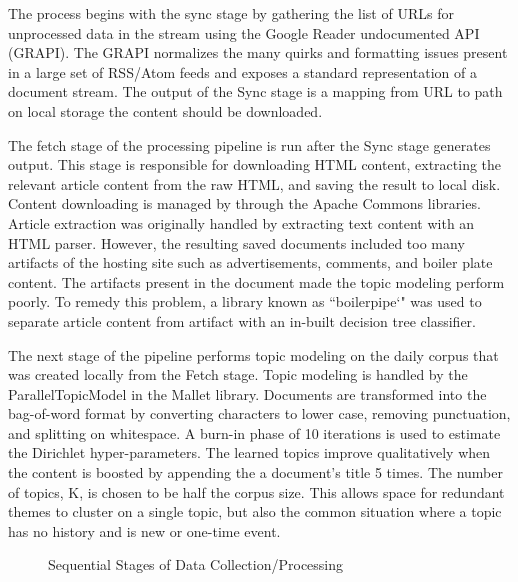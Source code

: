 \documentclass[10pt]{article}
\begin{document}
The process begins with the sync stage by gathering the list of URLs for unprocessed data in the stream using the Google Reader undocumented API (GRAPI).  The GRAPI normalizes the many quirks and formatting issues present in a large set of RSS/Atom feeds and exposes a standard representation of a document stream.  The output of the Sync stage is a mapping from URL to path on local storage the content should be downloaded.

The fetch stage of the processing pipeline is run after the Sync stage generates output.  This stage is responsible for downloading HTML content, extracting the relevant article content from the raw HTML, and saving the result to local disk.  Content downloading is managed by through the Apache Commons libraries.  Article extraction was originally handled by extracting text content with an HTML parser.  However, the resulting saved documents included too many artifacts of the hosting site such as advertisements, comments, and boiler plate content.  The artifacts present in the document made the topic modeling perform poorly.  To remedy this problem, a library known as ``boilerpipe`" was used to separate article content from artifact with an in-built decision tree classifier.

The next stage of the pipeline performs topic modeling on the daily corpus that was created locally from the Fetch stage.  Topic modeling is handled by the ParallelTopicModel in the Mallet library.  Documents are transformed into the bag-of-word format by converting characters to lower case, removing punctuation, and splitting on whitespace.  A burn-in phase of 10 iterations is used to estimate the Dirichlet hyper-parameters. The learned topics improve qualitatively when the content is boosted by appending the a document's title 5 times.  The number of topics, K, is chosen to be half the corpus size.  This allows space for redundant themes to cluster on a single topic, but also the common situation where a topic has no history and is new or one-time event.

\begin{figure}[htp] 
\caption{Sequential Stages of Data Collection/Processing}
\end{figure}  
\end{document}
